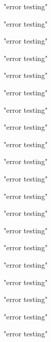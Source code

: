 \documentclass{article}
\begin{document}
\begin{Schunk}
\begin{Soutput}
[1] "error testing"
\end{Soutput}
\begin{Soutput}
[1] "error testing"
\end{Soutput}
\begin{Soutput}
[1] "error testing"
\end{Soutput}
\begin{Soutput}
[1] "error testing"
\end{Soutput}
\begin{Soutput}
[1] "error testing"
\end{Soutput}
\begin{Soutput}
[1] "error testing"
\end{Soutput}
\begin{Soutput}
[1] "error testing"
\end{Soutput}
\begin{Soutput}
[1] "error testing"
\end{Soutput}
\begin{Soutput}
[1] "error testing"
\end{Soutput}
\begin{Soutput}
[1] "error testing"
\end{Soutput}
\begin{Soutput}
[1] "error testing"
\end{Soutput}
\begin{Soutput}
[1] "error testing"
\end{Soutput}
\begin{Soutput}
[1] "error testing"
\end{Soutput}
\begin{Soutput}
[1] "error testing"
\end{Soutput}
\begin{Soutput}
[1] "error testing"
\end{Soutput}
\begin{Soutput}
[1] "error testing"
\end{Soutput}
\begin{Soutput}
[1] "error testing"
\end{Soutput}
\begin{Soutput}
[1] "error testing"
\end{Soutput}
\begin{Soutput}
[1] "error testing"
\end{Soutput}
\begin{Soutput}
[1] "error testing"

\end{Soutput}
\end{Schunk}
\end{document}
